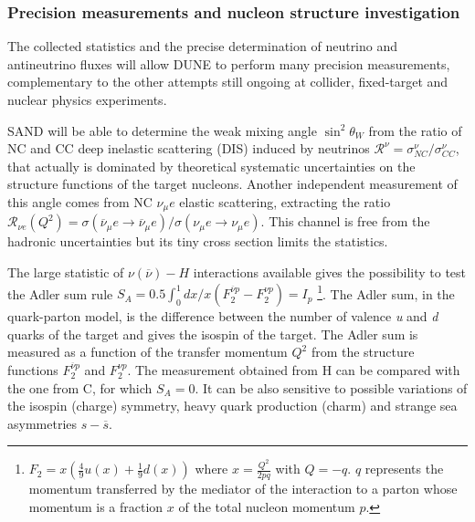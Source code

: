 \subsubsection{Precision measurements and nucleon structure investigation}
The collected statistics and the precise determination of neutrino and antineutrino fluxes will allow DUNE to perform many precision measurements, complementary to the other attempts still ongoing at collider, fixed-target and nuclear physics experiments. 

SAND will be able to determine the weak mixing angle $\sin^2 \theta_W$ from the ratio of NC and CC deep inelastic scattering (DIS) induced by neutrinos $\mathcal{R^\nu} = \sigma^\nu_{NC}/\sigma^\nu_{CC}$, that actually is dominated by theoretical systematic uncertainties on the structure functions of the target nucleons. Another independent measurement of this angle comes from NC $\nu_\mu e$ elastic scattering, extracting the ratio $\mathcal{R}_{\nu e}(Q^2) = \sigma(\overline{\nu}_\mu e \rightarrow \overline{\nu}_\mu e)/\sigma(\nu_\mu e \rightarrow \nu_\mu e)$. This channel is free from the hadronic uncertainties but its tiny cross section limits the statistics.%

The large statistic of $\nu(\overline{\nu}) - H$ interactions available gives the possibility to test the Adler sum rule $S_A = 0.5 \int_{0}^{1} dx/x (F_2^{\overline{\nu}p} - F_2^{\nu p}) = I_p$ \footnote{$F_2 = x(\frac{4}{9}u(x) + \frac{1}{9}d(x))$ where $x = \frac{Q^2}{2pq}$ with $Q = -q$. $q$ represents the momentum transferred by the mediator of the interaction to a parton whose momentum is a fraction $x$ of the total nucleon momentum $p$.}. The Adler sum, in the quark-parton model, is the difference between the number of valence \textit{u} and \textit{d} quarks of the target and gives the isospin of the target. The Adler sum is measured as a function of the transfer momentum $Q^2$ from the structure functions $F_2^{\overline{\nu}p}$ and $F_2^{{\nu}p}$. The measurement obtained from H can be compared with the one from C, for which $S_A = 0$. It can be also sensitive to possible variations of the isospin (charge) symmetry, heavy quark production (charm) and strange sea asymmetries $s - \overline{s}$.%

